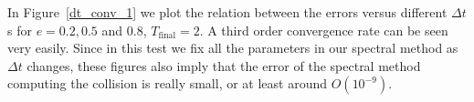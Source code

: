 \documentclass[review, times]{elsarticle}
\begin{document}
In Figure~\ref{dt_conv_1} we plot the relation between the errors versus different $\Delta t$s for $e = 0.2, 0.5$ and $0.8$, $T_\text{final}=2$. A third order convergence rate can be seen very easily. Since in this test we fix all the parameters in our spectral method as $\Delta t$ changes, these figures also imply that the error of the spectral method computing the collision is really small, or at least around $O(10^{-9})$.
\end{document}
